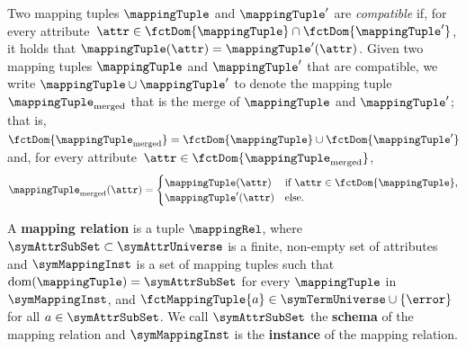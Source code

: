 Two mapping tuples $\mappingTuple$ and $\mappingTuple'$ are \emph{compatible} if, for every attribute~$\attr \in \fctDom{\mappingTuple} \cap \fctDom{\mappingTuple'}$, it holds that $\mappingTuple(\attr) = \mappingTuple'(\attr)$.
Given two mapping tuples $\mappingTuple$ and $\mappingTuple'$ that are compatible, we write $\mappingTuple \cup \mappingTuple'$ to denote the mapping tuple $\mappingTuple_\text{merged}$ that is the merge of $\mappingTuple$ and $\mappingTuple'$; that is, $\fctDom{\mappingTuple_\text{merged}} = \fctDom{\mappingTuple} \cup \fctDom{\mappingTuple'}$ and, for every attribute~$\attr \in \fctDom{\mappingTuple_\text{merged}}$,
\begin{equation*}
	\mappingTuple_\text{merged}(\attr) =
	\begin{cases}
		\mappingTuple(\attr) & \text{if $\attr \in \fctDom{\mappingTuple}$,} \\
		\mappingTuple'(\attr) & \text{else.}
	\end{cases}
\end{equation*}


\begin{definition}
	A \textbf{mapping relation} is a tuple $\mappingRel$, where
	$\symAttrSubSet \subset \symAttrUniverse$ is a finite, non-empty set of attributes
    and 	
	$\symMappingInst$ is a set of mapping tuples such that
	$\mathrm{dom}(\mappingTuple) = \symAttrSubSet$ for every $\mappingTuple$ in $\symMappingInst$, %
	and
	$\fctMappingTuple{a} \in \symTermUniverse \cup \{\error\}$ for all $a \in \symAttrSubSet$.
	We call $\symAttrSubSet$ the \textbf{schema} of the mapping relation
	and $\symMappingInst$ is the \textbf{instance} of the mapping relation.
	\label{def:mapping_relation}
\end{definition}





